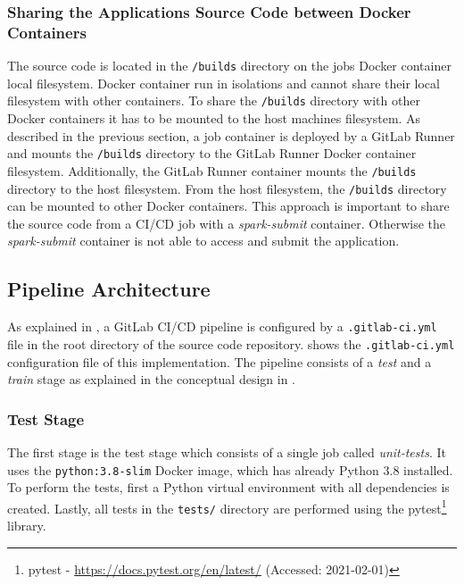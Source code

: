 \subsubsection{Sharing the Applications Source Code between Docker Containers}
The source code is located in the \texttt{/builds} directory on the jobs Docker container local filesystem. Docker container run in isolations and cannot share their local filesystem with other containers. To share the \texttt{/builds} directory with other Docker containers it has to be mounted to the host machines filesystem.
As described in the previous section, a job container is deployed by a GitLab Runner and mounts the \texttt{/builds} directory to the GitLab Runner Docker container filesystem. Additionally, the GitLab Runner container mounts the \texttt{/builds} directory to the host filesystem.
%
From the host filesystem, the \texttt{/builds} directory can be mounted to other Docker containers.
%
This approach is important to share the source code from a CI/CD job with a \textit{spark-submit} container. Otherwise the \textit{spark-submit} container is not able to access and submit the application.


\subsection{Pipeline Architecture}
%
As explained in , a GitLab CI/CD pipeline is configured by a \texttt{.gitlab-ci.yml} file in the root directory of the source code repository.
%
 shows the \texttt{.gitlab-ci.yml}  configuration file of this implementation. The pipeline consists of a \textit{test} and a \textit{train} stage as explained in the conceptual design in .


\subsubsection{Test Stage}
The first stage is the test stage which consists of a single job called \textit{unit-tests}.
It uses the \texttt{python:3.8-slim} Docker image, which has already Python 3.8 installed. To perform the tests, first a Python virtual environment with all dependencies is created. Lastly, all tests in the \texttt{tests/} directory are performed using the pytest\footnote{pytest - \url{https://docs.pytest.org/en/latest/} (Accessed: 2021-02-01)} library.


